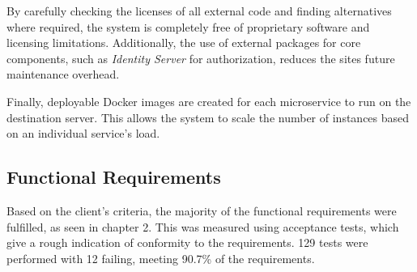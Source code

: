   \par
  By carefully checking the licenses of all external code and finding alternatives where required, the system is completely free of proprietary software and licensing limitations. Additionally, the use of external packages for core components, such as \textit{Identity Server} for authorization, reduces the sites future maintenance overhead.

  \par
  Finally, deployable Docker images are created for each microservice to run on the destination server. This allows the system to scale the number of instances based on an individual service's load.

  \subsection{Functional Requirements}
  \par
  Based on the client's criteria, the majority of the functional requirements were fulfilled, as seen in chapter 2. This was measured using acceptance tests, which give a rough indication of conformity to the requirements. 129 tests were performed with 12 failing, meeting 90.7\% of the requirements.
